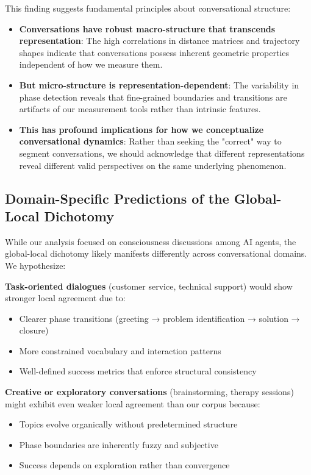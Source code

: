 \documentclass[11pt,letterpaper]{article}
\begin{document}
This finding suggests fundamental principles about conversational structure:
\begin{itemize}
\item \textbf{Conversations have robust macro-structure that transcends representation}: The high correlations in distance matrices and trajectory shapes indicate that conversations possess inherent geometric properties independent of how we measure them.
\item \textbf{But micro-structure is representation-dependent}: The variability in phase detection reveals that fine-grained boundaries and transitions are artifacts of our measurement tools rather than intrinsic features.
\item \textbf{This has profound implications for how we conceptualize conversational dynamics}: Rather than seeking the "correct" way to segment conversations, we should acknowledge that different representations reveal different valid perspectives on the same underlying phenomenon.
\end{itemize}

\subsection{Domain-Specific Predictions of the Global-Local Dichotomy}

While our analysis focused on consciousness discussions among AI agents, the global-local dichotomy likely manifests differently across conversational domains. We hypothesize:

\textbf{Task-oriented dialogues} (customer service, technical support) would show stronger local agreement due to:
\begin{itemize}
\item Clearer phase transitions (greeting → problem identification → solution → closure)
\item More constrained vocabulary and interaction patterns
\item Well-defined success metrics that enforce structural consistency
\end{itemize}

\textbf{Creative or exploratory conversations} (brainstorming, therapy sessions) might exhibit even weaker local agreement than our corpus because:
\begin{itemize}
\item Topics evolve organically without predetermined structure
\item Phase boundaries are inherently fuzzy and subjective
\item Success depends on exploration rather than convergence
\end{itemize}
\end{document}
